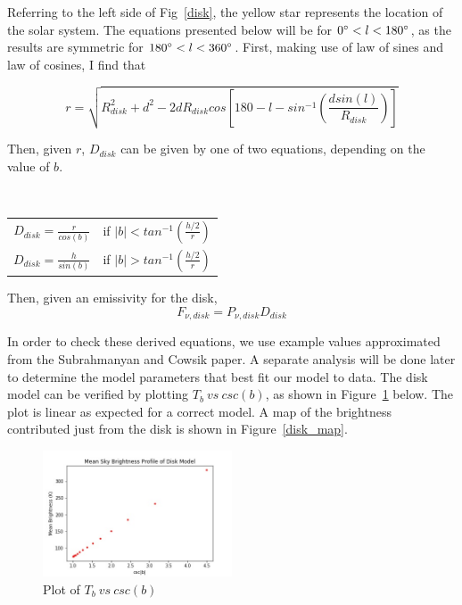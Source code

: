 \documentclass[letterpaper, 10pt]{article}
\begin{document}
Referring to the left side of Fig~\ref{disk}, the yellow star represents the location of the solar system. The equations presented below will be for $ 0\degree < l < 180\degree $, as the results are symmetric for $ 180\degree < l < 360\degree $. First, making use of law of sines and law of cosines, I find that 

\[ r = \sqrt{R_{disk}^{2} + d^{2} - 2dR_{disk}cos\left[180 - l - sin^{-1}\left(\frac{dsin(l)}{R_{disk}}\right)\right]} \]

Then, given $r$, $D_{disk}$ can be given by one of two equations, depending on the value of $b$. 

\begin{table}[h]\
\centering
\begin{tabular}{c c}
$ D_{disk} = \frac{r}{cos(b)} $ & if $|b| < tan^{-1} \left(\frac{h/2}{r} \right)$ \\

$ D_{disk} = \frac{h}{sin(b)} $ & if $|b| > tan^{-1} \left(\frac{h/2}{r} \right)$ \\

\end{tabular}
\end{table}

Then, given an emissivity for the disk, 
\[F_{\nu, disk} = P_{\nu, disk}D_{disk} \]

In order to check these derived equations, we use example values approximated from the Subrahmanyan and Cowsik paper. A separate analysis will be done later to determine the model parameters that best fit our model to data. The disk model can be verified by plotting $ T_{b}\ vs\ csc(b)$, as shown in Figure~\ref{cscb} below. The plot is linear as expected for a correct model. A map of the brightness contributed just from the disk is shown in Figure~\ref{disk_map}.

\begin{figure}[h]
\begin{center}
\includegraphics[width=0.5\textwidth]{cscb.jpg}
\caption{Plot of $ T_{b}\ vs\ csc(b)$}
\label{cscb}
\end{center}
\end{figure}
\end{document}
